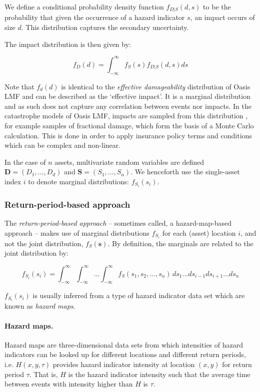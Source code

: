 \documentclass[a4paper,11pt]{extarticle} %
\begin{document}
We define a conditional probability density function $f_{D|S}(d, s)$ to be the probability that given the occurrence of a hazard indicator $s$, an impact occurs of size $d$. This distribution captures the secondary uncertainty.

The impact distribution is then given by: 
 
  \begin{equation}
 	\label{Eq:ImpactEffective}
 	f_D(d) = \int_{-\infty}^{\infty} f_S(s) f_{D|S}(d, s) ds
 \end{equation}

Note that $f_d(d)$ is identical to the {\it effective damageability} distribution of Oasis LMF\cite{OasisFinancialModule} and can be described as the `effective impact'. It is a marginal distribution and as such does not capture any correlation between events nor impacts. In the catastrophe models of Oasis LMF, impacts are sampled from this distribution \cite{OasisFinancialModule}, for example samples of fractional damage, which form the basis of a Monte Carlo calculation. This is done in order to apply insurance policy terms and conditions which can be complex and non-linear.

In the case of $n$ assets, multivariate random variables are defined $\mathbf{D} = (D_1,\ldots,D_d)$ and $\mathbf{S} = (S_1,\ldots,S_n)$. We henceforth use the single-asset index $i$ to denote marginal distributions: $f_{S_i}(s_i)$. 

\subsubsection{Return-period-based approach}

The \emph{return-period-based approach} -- sometimes called, a hazard-map-based approach -- makes use of marginal distributions $f_{S_i}$ for each (asset) location $i$, and not the joint distribution, $f_S(\mathbf{s})$. By definition, the marginals are related to the joint distribution by: 

 \begin{equation}
	\label{Eq:ImpactMarginal}
	f_{S_i}(s_i) = \int_{-\infty}^{\infty} \int_{-\infty}^{\infty} \dots \int_{-\infty}^{\infty} f_S(s_1,s_2, \dots,s_n) \,ds_1 \dots ds_{i-1} ds_{i + 1} \dots ds_n
\end{equation}

$f_{S_i}(s_i)$ is usually inferred from a type of hazard indicator data set which are known as \emph{hazard maps}.

\paragraph{Hazard maps.} Hazard maps are three-dimensional data sets from which intensities of hazard indicators can be looked up for different locations and different return periods, i.e. $H(x, y, \tau)$ provides hazard indicator intensity at location $(x, y)$ for return period $\tau$. That is, $H$ is the hazard indicator intensity such that the average time between events with intensity higher than $H$ is $\tau$. 
\end{document}

